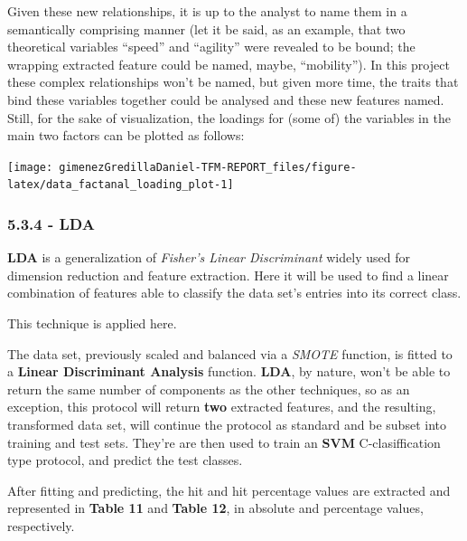 \documentclass[]{article}
\begin{document}
Given these new relationships, it is up to the analyst to name them in a
semantically comprising manner (let it be said, as an example, that two
theoretical variables ``speed'' and ``agility'' were revealed to be
bound; the wrapping extracted feature could be named, maybe,
``mobility''). In this project these complex relationships won't be
named, but given more time, the traits that bind these variables
together could be analysed and these new features named. Still, for the
sake of visualization, the loadings for (some of) the variables in the
main two factors can be plotted as follows:

\texttt{[image: gimenezGredillaDaniel-TFM-REPORT\_files/figure-latex/data\_factanal\_loading\_plot-1]}

\subsubsection{5.3.4 - LDA}\label{lda-1}

\textbf{LDA} is a generalization of \emph{Fisher's Linear Discriminant}
widely used for dimension reduction and feature extraction. Here it will
be used to find a linear combination of features able to classify the
data set's entries into its correct class.

This technique is applied here.

The data set, previously scaled and balanced via a \emph{SMOTE}
function, is fitted to a \textbf{Linear Discriminant Analysis} function.
\textbf{LDA}, by nature, won't be able to return the same number of
components as the other techniques, so as an exception, this protocol
will return \textbf{two} extracted features, and the resulting,
transformed data set, will continue the protocol as standard and be
subset into training and test sets. They're are then used to train an
\textbf{SVM} C-clasiffication type protocol, and predict the test
classes.

After fitting and predicting, the hit and hit percentage values are
extracted and represented in \textbf{Table 11} and \textbf{Table 12}, in
absolute and percentage values, respectively.
\end{document}
